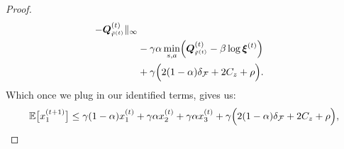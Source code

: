 \begin{proof}
\begin{equation}
\begin{aligned}
            - {\bm{Q}}^{(t)}_{\tilde{r}^{(t)}} \|_\infty  \\ &
            -\gamma \alpha  \min_{s,a} \Bigl(\bm{Q}^{(t)}_{\tilde{r}^{(t)}} - \beta \log \bm{\xi}^{(t)}  \Bigr) \\ &
            +  \gamma \Bigl(  2(1-\alpha)\delta_\mathcal{F}+2C_z  + \rho\Bigr).
        \end{aligned}
    \end{equation}
    Which once we plug in our identified terms, gives us:
    \begin{equation}
        \label{eq:ineq_q_subopt}
        \mathbb{E}\big[ x_1^{(t+1)} \big] \leq
        \gamma(1-\alpha)  x_1^{(t)}
        +\gamma \alpha x_2^{(t)}
        +\gamma \alpha  x_3^{(t)}
        + \gamma \Bigl(  2(1-\alpha)\delta_\mathcal{F}+2C_z +\rho \Bigr), 
    \end{equation}


\end{proof}
